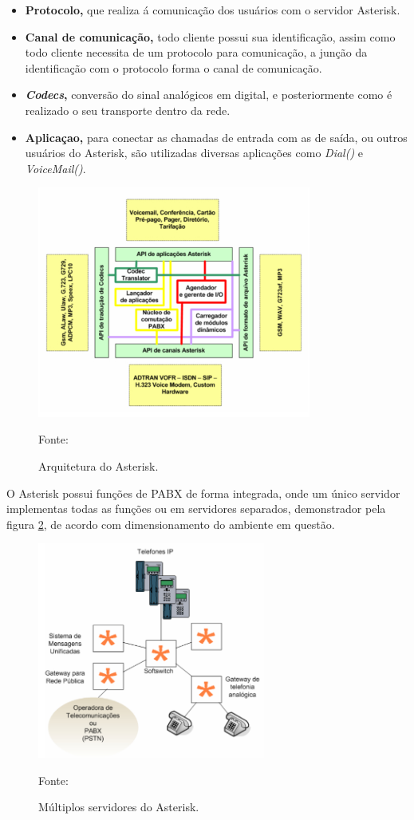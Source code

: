 \begin{itemize}
  \item \textbf{Protocolo,} que realiza á comunicação dos usuários com o servidor Asterisk.
  \item \textbf{Canal de comunicação,} todo cliente possui sua identificação, assim como todo cliente necessita de um protocolo para comunicação, a junção da identificação com o protocolo forma o canal de comunicação.
  \item \textbf{\textit{Codecs},} conversão do sinal analógicos em digital, e posteriormente como é realizado o seu transporte dentro da rede.
  \item \textbf{Aplicaçao,} para conectar as chamadas de entrada com as de saída, ou outros usuários do Asterisk, são utilizadas diversas aplicações como \textit{Dial()} e \textit{VoiceMail()}.
\end{itemize}

\begin{figure}[h]
	\centering
	\includegraphics[width=9cm]{imagens/arquiteturaAsterisk.jpg}
	\caption{Arquitetura do Asterisk.}
    \label{Figura12}
    Fonte: \cite{flavioeduardoandredade2005}
\end{figure}

O Asterisk possui funções de PABX de forma integrada, onde um único servidor implementas todas as funções ou em servidores separados, demonstrador pela figura \ref{Figura13}, de acordo com dimensionamento do ambiente em questão. \cite{djaneelmajoanine2007}

\begin{figure}[h]
	\centering
	\includegraphics[width=7.5cm]{imagens/servidoresAsterisk.jpg}
	\caption{Múltiplos servidores do Asterisk.}
    \label{Figura13}
    Fonte: \cite{flavioeduardoandredade2005}
\end{figure}

